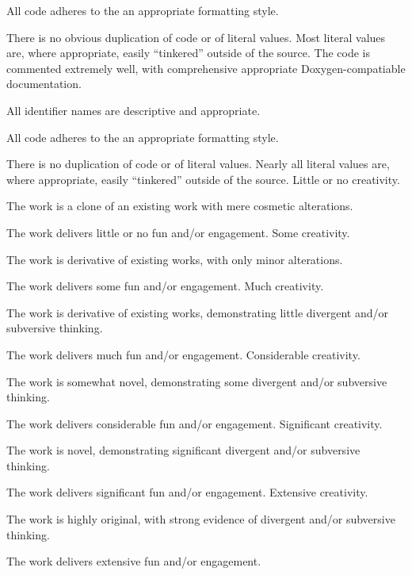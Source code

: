 \documentclass{../fal_assignment}
\begin{document}
\begin{markingrubric}
            \par All code adheres to the an appropriate formatting style.
             \par There is no obvious duplication of code or of literal values. Most literal values are, where appropriate, easily ``tinkered'' outside of the source.  
        \grade The code is commented extremely well, with comprehensive appropriate Doxygen-compatiable documentation.
            \par All identifier names are descriptive and appropriate.
            \par All code adheres to the an appropriate formatting style.
            \par There is no duplication of code or of literal values. Nearly all literal values are, where appropriate, easily ``tinkered'' outside of the source.  
%
        \grade\fail Little or no creativity.
            \par The work is a clone of an existing work with mere cosmetic alterations.
            \par The work delivers little or no fun and/or engagement.
        \grade Some creativity.
            \par The work is derivative of existing works, with only minor alterations.
            \par The work delivers some fun and/or engagement.
        \grade Much creativity.
            \par The work is derivative of existing works, demonstrating little divergent and/or subversive thinking.
            \par The work delivers much fun and/or engagement.
        \grade Considerable creativity.
            \par The work is somewhat novel, demonstrating some divergent and/or subversive thinking.
            \par The work delivers considerable fun and/or engagement.
        \grade Significant creativity.
            \par The work is novel, demonstrating significant divergent and/or subversive thinking.
            \par The work delivers significant fun and/or engagement.
        \grade Extensive creativity.
            \par The work is highly original, with strong evidence of divergent and/or subversive thinking.
            \par The work delivers extensive fun and/or engagement.

\end{markingrubric}
\end{document}
